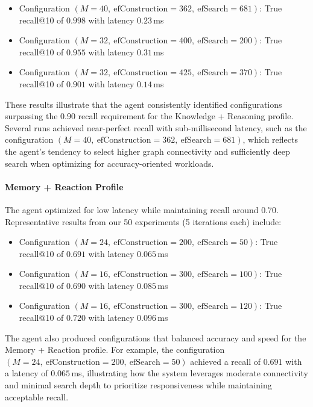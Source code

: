 \documentclass{article}
\begin{document}
\begin{itemize}
    \item Configuration $(M=40,\ \text{efConstruction}=362,\ \text{efSearch}=681)$: True recall@10 of $0.998$ with latency $0.23$\,ms
    \item Configuration $(M=32,\ \text{efConstruction}=400,\ \text{efSearch}=200)$: True recall@10 of $0.955$ with latency $0.31$\,ms
    \item Configuration $(M=32,\ \text{efConstruction}=425,\ \text{efSearch}=370)$: True recall@10 of $0.901$ with latency $0.14$\,ms
\end{itemize}
These results illustrate that the agent consistently identified configurations surpassing the 0.90 recall requirement for the Knowledge + Reasoning profile. Several runs achieved near-perfect recall with sub-millisecond latency, such as the configuration $(M=40,\ \text{efConstruction}=362,\ \text{efSearch}=681)$, which reflects the agent's tendency to select higher graph connectivity and sufficiently deep search when optimizing for accuracy-oriented workloads.


\paragraph{Memory + Reaction Profile}
The agent optimized for low latency while maintaining recall around $0.70$. Representative results from our 50 experiments (5 iterations each) include:

\begin{itemize}
    \item Configuration $(M=24,\ \text{efConstruction}=200,\ \text{efSearch}=50)$: True recall@10 of $0.691$ with latency $0.065$\,ms
    \item Configuration $(M=16,\ \text{efConstruction}=300,\ \text{efSearch}=100)$: True recall@10 of $0.690$ with latency $0.085$\,ms
    \item Configuration $(M=16,\ \text{efConstruction}=300,\ \text{efSearch}=120)$: True recall@10 of $0.720$ with latency $0.096$\,ms
\end{itemize}
The agent also produced configurations that balanced accuracy and speed for the Memory + Reaction profile. For example, the configuration $(M=24,\ \text{efConstruction}=200,\ \text{efSearch}=50)$ achieved a recall of $0.691$ with a latency of $0.065$\,ms, illustrating how the system leverages moderate connectivity and minimal search depth to prioritize responsiveness while maintaining acceptable recall.
\end{document}
